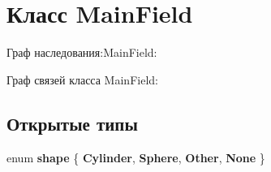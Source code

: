 \hypertarget{class_main_field}{}\section{Класс Main\+Field}
\label{class_main_field}


Граф наследования\+:Main\+Field\+:


Граф связей класса Main\+Field\+:
\subsection*{Открытые типы}
\begin{DoxyCompactItemize}
\item 
\mbox{\label{class_main_field_a3f75216de71d35277dff755f57f99d8e}} 
enum {\bfseries shape} \{ {\bfseries Cylinder}, 
{\bfseries Sphere}, 
{\bfseries Other}, 
{\bfseries None}
 \}
\end{DoxyCompactItemize}
